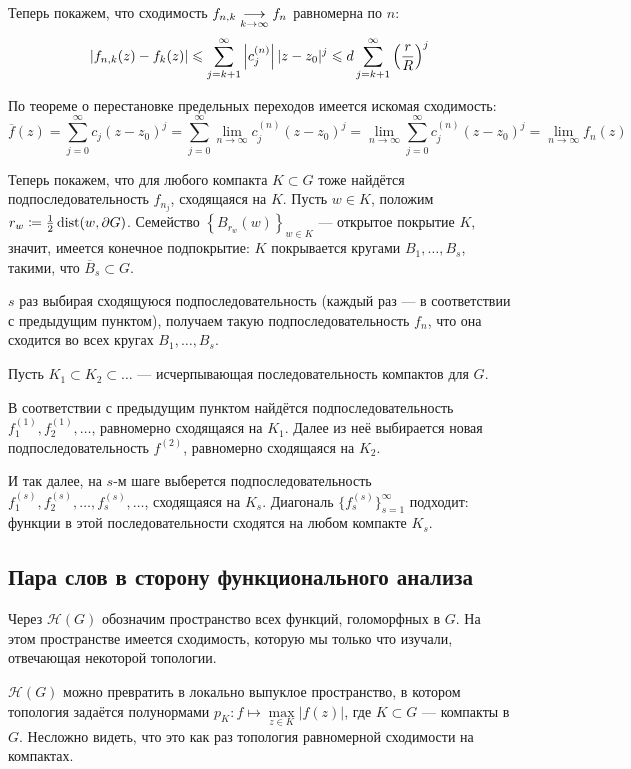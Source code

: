 \documentclass[a4paper]{report}
\begin{document}
{{{{    Теперь покажем, что сходимость $f_{n,k} \underset{k \to \infty}{\longrightarrow} f_n$ равномерна по $n$:
    \[\left|f_{n,k}(z) - f_k(z)\right| \leqslant \sum\limits_{j = k + 1}^{\infty}\left|c_j^{(n)}\right||z - z_0|^j \leqslant d\sum\limits_{j = k + 1}^{\infty}\left(\frac{r}{R}\right)^j\]
    \item По теореме о перестановке предельных переходов имеется искомая сходимость: \[\overline{f}(z) = \sum\limits_{j = 0}^{\infty}c_j (z - z_0)^{j} = \sum\limits_{j = 0}^{\infty}\lim\limits_{n \to \infty}c_j^{(n)} (z - z_0)^{j} = \lim\limits_{n \to \infty}\sum\limits_{j = 0}^{\infty}c_j^{(n)} (z - z_0)^{j} = \lim\limits_{n \to \infty} f_n(z)\]
    }
    \item Теперь покажем, что для любого компакта $K \subset G$ тоже найдётся подпоследовательность $f_{n_j}$, сходящаяся на $K$.
    Пусть $w \in K$, положим $r_w \coloneqq \frac{1}{2}\operatorname{dist}(w, \partial G)$.
        Семейство $\left\{B_{r_w}(w)\right\}_{w \in K}$ --- открытое покрытие $K$, значит, имеется конечное подпокрытие: $K$ покрывается кругами $B_1, \dots, B_s$, такими, что $\overline{B}_s \subset G$.

    $s$ раз выбирая сходящуюся подпоследовательность (каждый раз --- в соответствии с предыдущим пунктом), получаем такую подпоследовательность $f_n$, что она сходится во всех кругах $B_1, \dots, B_s$.
    \item Пусть $K_1 \subset K_2 \subset \dots$ --- исчерпывающая последовательность компактов для $G$.

    В соответствии с предыдущим пунктом найдётся подпоследовательность $f_1^{(1)}, f_2^{(1)}, \dots$, равномерно сходящаяся на $K_1$.
    Далее из неё выбирается новая подпоследовательность $f^{(2)}$, равномерно сходящаяся на $K_2$.

    И так далее, на $s$-м шаге выберется подпоследовательность $f^{(s)}_1, f^{(s)}_2, \dots, f^{(s)}_s, \dots$, сходящаяся на $K_s$.
    Диагональ $\{f_s^{(s)}\}_{s = 1}^{\infty}$ подходит: функции в этой последовательности сходятся на любом компакте $K_s$.\qedhere
    }
    }
    }
    \subsection{Пара слов в сторону функционального анализа}
    Через $\mathcal{H}(G)$ обозначим пространство всех функций, голоморфных в $G$.
    На этом пространстве имеется сходимость, которую мы только что изучали, отвечающая некоторой топологии.

    $\mathcal{H}(G)$ можно превратить в локально выпуклое пространство, в котором топология задаётся полунормами $p_K: f \mapsto \max\limits_{z \in K}|f(z)|$, где $K \subset G$ --- компакты в $G$.
    Несложно видеть, что это как раз топология равномерной сходимости на компактах.
\end{document}
